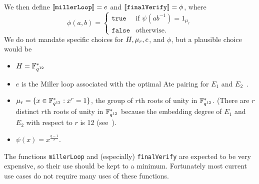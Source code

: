 \noindent We then define $\llbracket\mathit{\mathtt{millerLoop}}\rrbracket = e$ and
$\llbracket\mathit{\mathtt{finalVerify}}\rrbracket = \phi$, where
$$
\phi(a,b) = \begin{cases}
               \mathtt{true} & \text{if $\psi(ab^{-1}) = 1_{\mu_r}$} \\
               \mathtt{false} & \text{otherwise.}
            \end{cases}
$$
We do not mandate specific choices for $H, \mu_r, e$, and $\phi$, but a
plausible choice would be
\begin{itemize}
\item $H = \mathbb{F}_{q^{12}}^*$
\item $e$ is the Miller loop associated with the optimal Ate pairing
for $E_1$ and $E_2$~\cite{Vercauteren}.
\item $\mu_r = \{x \in \mathbb{F}_{q^{12}}^*: x^r=1\}$, the group of $r$th roots of unity in $\mathbb{F}_{q^{12}}^*$.
(There are $r$ distinct $r$th roots of unity in $\mathbb{F}_{q^{12}}^*$ because the embedding
degree of $E_1$ and $E_2$ with respect to $r$ is 12 (see~\cite[4.1]{Costello-pairings}).
\item $\psi(x) = x^{\frac{q-1}{r}}$.
\end{itemize}

\noindent The functions \texttt{millerLoop} and (especially) \texttt{finalVerify} are expected
to be very expensive, so their use should be kept to a minimum.  Fortunately
most current use cases do not require many uses of these functions.


